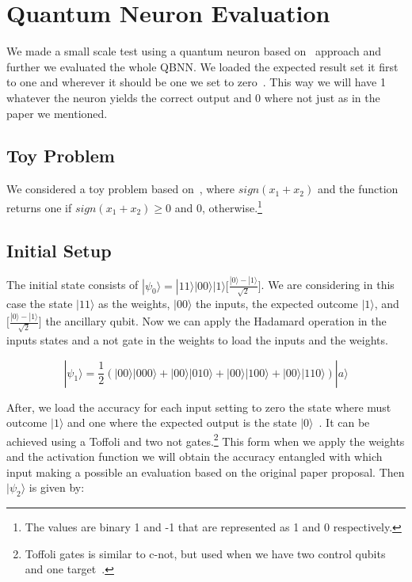 \documentclass[conference]{IEEEtran}
\begin{document}
\section{Quantum Neuron Evaluation}\label{sec:quantum-neuron-evaluation}

 We made a small scale test using a quantum neuron based on~\cite{fawaz2019training} approach and further we evaluated
 the whole QBNN.
 We loaded the expected result set it first to one and wherever it should be one we set to zero~\cite{fawaz2019training}.
 This way we will have 1 whatever the neuron yields the correct output and 0 where not just as in the paper we mentioned.

 \subsection*{Toy Problem}
    We considered a toy problem based on~\cite{fawaz2019training}, where \(sign(x_1 + x_2)\) and the function returns one
    if \(sign(x_1 + x_2) \geq 0\) and 0, otherwise.\footnote{The values are binary 1 and -1 that are represented as 1
    and 0 respectively.}

\subsection{Initial Setup}\label{subsec:initial-setup}


The initial state consists of \(|\psi_0\rangle = |11\rangle|00\rangle|1\rangle\Big[\frac{|0\rangle - |1\rangle}{\sqrt{2}}\Big]\).
We are considering in this case the state \(|11\rangle\) as the weights, \(|00\rangle\) the inputs, the expected outcome \(|1\rangle\), and
\(\Big[\frac{|0\rangle - |1\rangle}{\sqrt{2}}\Big]\) the ancillary qubit.
Now we can apply the Hadamard operation in the inputs states and a not gate in the weights to load the inputs and the weights.

\begin{equation}
|\psi_1\rangle = \frac{1}{2}(|00\rangle|000\rangle + |00\rangle|010\rangle + |00\rangle|100\rangle + |00\rangle|110\rangle)
|a\rangle
\end{equation}

After, we load the accuracy for each input setting to zero the state where must outcome \(|1\rangle\) and one where the
expected output is the state $|0\rangle$~\cite{fawaz2019training}.
It can be achieved using a Toffoli and two not gates.\footnote{Toffoli gates is similar to c-not, but used when we have
two control qubits and one target~\cite{yanofsky2008quantum}.}
This form when we apply the weights and the activation function we will obtain the accuracy entangled with which input
making a possible an evaluation based on the original paper proposal.
Then \(|\psi_2\rangle\) is given by:
\end{document}
